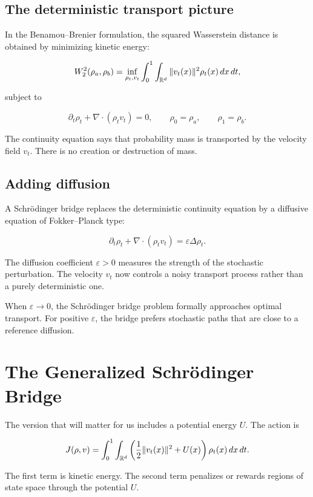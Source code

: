 \subsection{The deterministic transport picture}

In the Benamou--Brenier formulation, the squared Wasserstein distance is
obtained by minimizing kinetic energy:

\[
W_2^2(\rho_a,\rho_b)
=
\inf_{\rho_t,v_t}
\int_0^1
\int_{\mathbb{R}^d}
\|v_t(x)\|^2
\rho_t(x)\,dx\,dt,
\]

subject to

\[
\partial_t\rho_t+\nabla\cdot(\rho_t v_t)=0,
\qquad
\rho_0=\rho_a,
\qquad
\rho_1=\rho_b.
\]

The continuity equation says that probability mass is transported by the
velocity field $v_t$. There is no creation or destruction of mass.

\subsection{Adding diffusion}

A Schr\"odinger bridge replaces the deterministic continuity equation by a
diffusive equation of Fokker--Planck type:

\[
\partial_t\rho_t+\nabla\cdot(\rho_t v_t)
=
\varepsilon \Delta \rho_t.
\]

The diffusion coefficient $\varepsilon>0$ measures the strength of the
stochastic perturbation. The velocity $v_t$ now controls a noisy transport
process rather than a purely deterministic one.

\begin{remark}
When $\varepsilon\to 0$, the Schr\"odinger bridge problem formally approaches
optimal transport. For positive $\varepsilon$, the bridge prefers stochastic
paths that are close to a reference diffusion.
\end{remark}

\section{The Generalized Schr\"odinger Bridge}

The version that will matter for us includes a potential energy $U$. The
action is

\[
J(\rho,v)
=
\int_0^1
\int_{\mathbb{R}^d}
\left(
\frac12\|v_t(x)\|^2+U(x)
\right)
\rho_t(x)\,dx\,dt.
\]

The first term is kinetic energy. The second term penalizes or rewards regions
of state space through the potential $U$.

